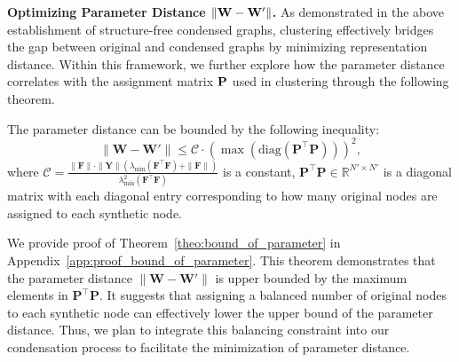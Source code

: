 \textbf{Optimizing Parameter Distance $\|{\bf W} - {\bf W}'\|$.} As demonstrated in the above establishment of structure-free condensed graphs, clustering effectively bridges the gap between original and condensed graphs by minimizing representation distance. Within this framework, we further explore how the parameter distance correlates with the assignment matrix ${\bf P}$ used in clustering through the following theorem.
\begin{theorem}
The parameter distance can be bounded by the following inequality:
    \begin{equation}
        \| \mathbf{W} - \mathbf{W}' \| \leq \mathcal{C}\cdot (\max (\text{diag}(\mathbf{\mathbf{P}^\top\mathbf{P}})))^2,
    \label{equ:balance}\end{equation}
    where $\mathcal{C}=\frac{\|\mathbf{F} \| \cdot \| \mathbf{Y}\|({\lambda_{\min}(\mathbf{F}^\top\mathbf{F})}+\|\mathbf{F} \|)}{{\lambda^2_{\min}(\mathbf{F}^\top\mathbf{F})}}$ is a constant, $\mathbf{P}^\top\mathbf{P} \in \mathbb{R}^{N' \times N'}$ is a diagonal matrix with each diagonal entry corresponding to how many original nodes are assigned to each synthetic node. 
\label{theo:bound_of_parameter}
\end{theorem}
We provide proof of Theorem~\ref{theo:bound_of_parameter} in Appendix~\ref{app:proof_bound_of_parameter}. This theorem demonstrates that the parameter distance \( \| \mathbf{W} - \mathbf{W}' \| \) is upper bounded by the maximum elements in $\mathbf{P}^\top\mathbf{P}$.  It suggests that assigning a balanced number of original nodes to each synthetic node can effectively lower the upper bound of the parameter distance. Thus, we plan to integrate this balancing constraint into our condensation process to facilitate the minimization of parameter distance.



